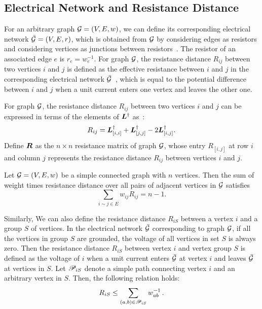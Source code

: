 \documentclass[10pt,twocolumn,twoside]{IEEEtran}
\begin{document}
\subsection{Electrical Network and Resistance Distance}

For an arbitrary graph \(\mathcal{G}=(V,E,w)\), we can define its corresponding electrical network \(\bar{\mathcal{G}}=(V,E,r)\), which is obtained from \(\mathcal{G}\)  by considering edges as resistors and considering vertices as junctions between resistors~\cite{DoSn84}. The resistor of an associated  edge \(e\) is \(r_e=w_e^{-1}\).  For graph  \(\mathcal{G}\), the resistance distance \(R_{ij}\) between two vertices \(i\) and \(j\)  is defined as the effective resistance between \(i\) and \(j\) in the corresponding  electrical network \(\bar{\mathcal{G}}\)~\cite{KlRa93}, which is equal to the potential difference between \(i\) and \(j\) when a unit current enters one vertex and leaves the other one.

For graph \(\mathcal{G}\), the resistance distance \(R_{ij}\) between two vertices \(i\) and \(j\) can be expressed in terms of the elements of \(\boldsymbol{L}^{\dagger}\) as~\cite{KlRa93}:
\begin{equation}\label{EE04}
    R_{ij}={\boldsymbol{L}}_{[i,i]}^{\dagger}+{\boldsymbol{L}}_{[j,j]}^{\dagger}-2{\boldsymbol{L}}_{[i,j]}^{\dagger}.
\end{equation}
Define \(\boldsymbol{R}\) as the \(n \times n\) resistance matrix of graph \(\mathcal{G}\), whose entry \(R_{[i,j]}\) at row \(i\) and column \(j\) represents the resistance distance \(R_{ij}\) between vertices \(i\) and \(j\).

\begin{lemma}\label{Foster} \cite{Te91}
    Let \(\mathcal{G}=(V,E,w)\) be a simple connected graph with \(n\) vertices. Then the sum of  weight times resistance distance over all pairs of adjacent vertices in  \(\mathcal{G}\)  satisfies
    \begin{equation*}
        \sum_{ i\sim j\in E }w_{ij}R_{ij}=n-1.
    \end{equation*}
\end{lemma}

Similarly, We can also define the resistance distance \(R_{iS}\) between a vertex $i$ and a group  \(S\) of vertices. In the electrical network \(\bar{\mathcal{G}}\) corresponding to graph \(\mathcal{G}\), if all  the vertices in group \(S\) are grounded, the voltage of all vertices in set  \(S\) is always zero.
Then the resistance distance \(R_{iS}\) between vertex \(i\) and vertex group \(S\) is defined as the voltage of \(i\) when a unit current enters \(\bar{\mathcal{G}}\) at vertex $i$ and leaves \(\bar{\mathcal{G}}\) at  vertices in \(S\).  Let \(\mathscr{P}_{iS}\) denote a simple path connecting vertex \(i\) and an arbitrary vertex in \(S\). Then, the following relation holds:
\begin{equation}\label{eq:phy-resist}
    R_{iS}\le \sum_{\left( a,b \right)\in\mathscr{P}_{iS}}w_{ab}^{-1}\,.
\end{equation}
\end{document}
